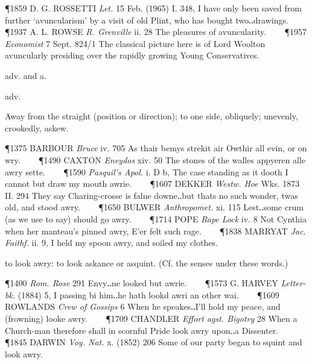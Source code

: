 \begin{description}[wide, labelwidth=!, labelindent=0pt]
\begin{myenumerate}
\P 1859 D. G. ROSSETTI  \textit{Let.} 15 Feb. (1965) I. 348, I have only been saved from further ‘avuncularism’ by a visit of old Plint, who has bought two‥drawings.    
\P 1937 A. L. ROWSE  \textit{R. Grenville} ii. 28 The pleasures of avuncularity.    
\P 1957 \textit{Economist}  7 Sept. 824/1 The classical picture here is of Lord Woolton avuncularly presiding over the rapidly growing Young Conservatives.
\end{myenumerate}



 adv. and a.

\noindent {}

\vspace{-0.3cm}

\begin{myenumerate}

 adv.

 Away from the straight (position or direction); to one side, obliquely; unevenly, crookedly, askew.

\P 1375 BARBOUR  \textit{Bruce} iv. 705 As thair bemys strekit air Owthir all evin, or on wry.    
\P 1490 CAXTON  \textit{Eneydos} xiv. 50 The stones of the walles appyeren alle awry sette.    
\P 1590 \textit{Pasquil's  Apol.} i. D b, The case standing as it dooth I cannot but draw my mouth awrie.    
\P 1607 DEKKER  \textit{Westw. Hoe} Wks. 1873 II. 294  They say Charing-crosse is falne downe‥but thats no such wonder, twas old, and stood awry.    
\P 1650 BULWER  \textit{Anthropomet.} xi. 115 Lest‥some crum (as we use to say) should go awry.    
\P 1714 POPE  \textit{Rape Lock} iv. 8 Not Cynthia when her manteau's pinned awry, E'er felt such rage.    
\P 1838 MARRYAT  \textit{Jac. Faithf.} ii. 9, I held my spoon awry, and soiled my clothes.

 to look awry: to look askance or asquint. (Cf. the senses under these words.)

\P 1400  \textit{Rom. Rose} 291 Envy‥ne looked but awrie.    
\P 1573 G. HARVEY  \textit{Letter-bk.} (1884) 5, I passing bi him‥he hath lookd awri an other wai.    
\P 1609 ROWLANDS  \textit{Crew of Gossips} 6 When he speakes‥I'll hold my peace, and (frowning) looke awry.    
\P 1709 CHANDLER  \textit{Effort agst. Bigotry} 28 When a Church-man therefore shall in scornful Pride look awry upon‥a Dissenter.    
\P 1845 DARWIN  \textit{Voy. Nat.} x. (1852) 206 Some of our party began to squint and look awry.


\end{myenumerate}
\end{description}
